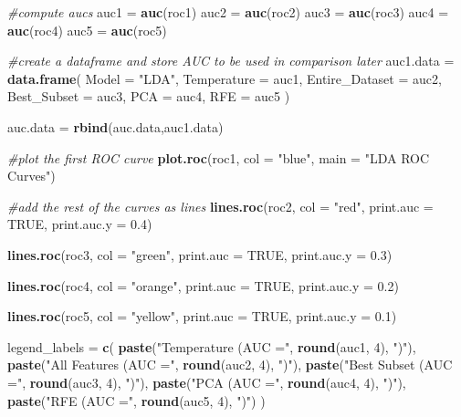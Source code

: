 \documentclass[
]{article}
\newenvironment{Shaded}{\begin{snugshade}}{\end{snugshade}}
\newcommand{\AttributeTok}[1]{\textcolor[rgb]{0.13,0.29,0.53}{#1}}
\newcommand{\CommentTok}[1]{\textcolor[rgb]{0.56,0.35,0.01}{\textit{#1}}}
\newcommand{\ConstantTok}[1]{\textcolor[rgb]{0.56,0.35,0.01}{#1}}
\newcommand{\DecValTok}[1]{\textcolor[rgb]{0.00,0.00,0.81}{#1}}
\newcommand{\FloatTok}[1]{\textcolor[rgb]{0.00,0.00,0.81}{#1}}
\newcommand{\FunctionTok}[1]{\textcolor[rgb]{0.13,0.29,0.53}{\textbf{#1}}}
\newcommand{\NormalTok}[1]{#1}
\newcommand{\OtherTok}[1]{\textcolor[rgb]{0.56,0.35,0.01}{#1}}
\newcommand{\StringTok}[1]{\textcolor[rgb]{0.31,0.60,0.02}{#1}}
\begin{document}
\begin{Shaded}
\begin{Highlighting}[]
\CommentTok{\#compute aucs}
\NormalTok{auc1 }\OtherTok{=} \FunctionTok{auc}\NormalTok{(roc1)}
\NormalTok{auc2 }\OtherTok{=} \FunctionTok{auc}\NormalTok{(roc2)}
\NormalTok{auc3 }\OtherTok{=} \FunctionTok{auc}\NormalTok{(roc3)}
\NormalTok{auc4 }\OtherTok{=} \FunctionTok{auc}\NormalTok{(roc4)}
\NormalTok{auc5 }\OtherTok{=} \FunctionTok{auc}\NormalTok{(roc5)}

\CommentTok{\#create a dataframe and store AUC to be used in comparison later}
\NormalTok{auc1.data }\OtherTok{=} \FunctionTok{data.frame}\NormalTok{(}
  \AttributeTok{Model =} \StringTok{"LDA"}\NormalTok{,}
  \AttributeTok{Temperature =}\NormalTok{ auc1,}
  \AttributeTok{Entire\_Dataset =}\NormalTok{ auc2,}
  \AttributeTok{Best\_Subset =}\NormalTok{ auc3,}
  \AttributeTok{PCA =}\NormalTok{ auc4,}
  \AttributeTok{RFE =}\NormalTok{ auc5}
\NormalTok{)}

\NormalTok{auc.data }\OtherTok{=} \FunctionTok{rbind}\NormalTok{(auc.data,auc1.data)}

\CommentTok{\#plot the first ROC curve}
\FunctionTok{plot.roc}\NormalTok{(roc1, }\AttributeTok{col =} \StringTok{"blue"}\NormalTok{, }\AttributeTok{main =} \StringTok{"LDA ROC Curves"}\NormalTok{)}

\CommentTok{\#add the rest of the curves as lines}
\FunctionTok{lines.roc}\NormalTok{(roc2, }\AttributeTok{col =} \StringTok{"red"}\NormalTok{, }\AttributeTok{print.auc =} \ConstantTok{TRUE}\NormalTok{, }\AttributeTok{print.auc.y =} \FloatTok{0.4}\NormalTok{)}

\FunctionTok{lines.roc}\NormalTok{(roc3, }\AttributeTok{col =} \StringTok{"green"}\NormalTok{, }\AttributeTok{print.auc =} \ConstantTok{TRUE}\NormalTok{, }\AttributeTok{print.auc.y =} \FloatTok{0.3}\NormalTok{)}

\FunctionTok{lines.roc}\NormalTok{(roc4, }\AttributeTok{col =} \StringTok{"orange"}\NormalTok{, }\AttributeTok{print.auc =} \ConstantTok{TRUE}\NormalTok{, }\AttributeTok{print.auc.y =} \FloatTok{0.2}\NormalTok{)}

\FunctionTok{lines.roc}\NormalTok{(roc5, }\AttributeTok{col =} \StringTok{"yellow"}\NormalTok{, }\AttributeTok{print.auc =} \ConstantTok{TRUE}\NormalTok{, }\AttributeTok{print.auc.y =} \FloatTok{0.1}\NormalTok{)}

\NormalTok{legend\_labels }\OtherTok{=} \FunctionTok{c}\NormalTok{(}
  \FunctionTok{paste}\NormalTok{(}\StringTok{"Temperature (AUC ="}\NormalTok{, }\FunctionTok{round}\NormalTok{(auc1, }\DecValTok{4}\NormalTok{), }\StringTok{")"}\NormalTok{),}
  \FunctionTok{paste}\NormalTok{(}\StringTok{"All Features (AUC ="}\NormalTok{, }\FunctionTok{round}\NormalTok{(auc2, }\DecValTok{4}\NormalTok{), }\StringTok{")"}\NormalTok{),}
  \FunctionTok{paste}\NormalTok{(}\StringTok{"Best Subset (AUC ="}\NormalTok{, }\FunctionTok{round}\NormalTok{(auc3, }\DecValTok{4}\NormalTok{), }\StringTok{")"}\NormalTok{),}
  \FunctionTok{paste}\NormalTok{(}\StringTok{"PCA (AUC ="}\NormalTok{, }\FunctionTok{round}\NormalTok{(auc4, }\DecValTok{4}\NormalTok{), }\StringTok{")"}\NormalTok{),}
  \FunctionTok{paste}\NormalTok{(}\StringTok{"RFE (AUC ="}\NormalTok{, }\FunctionTok{round}\NormalTok{(auc5, }\DecValTok{4}\NormalTok{), }\StringTok{")"}\NormalTok{)}
\NormalTok{)}


\end{Highlighting}
\end{Shaded}
\end{document}
